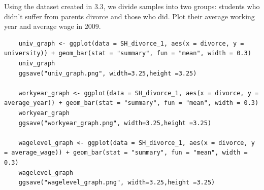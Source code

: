 \documentclass[11pt, letterpaper]{article}
\begin{document}
Using the dataset created in 3.3, we divide samples into two groups: students who didn't suffer from parents divorce and those who did.
Plot their average working year and average wage in 2009. 

\begin{lstlisting}
    univ_graph <- ggplot(data = SH_divorce_1, aes(x = divorce, y = university)) + geom_bar(stat = "summary", fun = "mean", width = 0.3)
    univ_graph
    ggsave("univ_graph.png", width=3.25,height =3.25)

    workyear_graph <- ggplot(data = SH_divorce_1, aes(x = divorce, y = average_year)) + geom_bar(stat = "summary", fun = "mean", width = 0.3)
    workyear_graph
    ggsave("workyear_graph.png", width=3.25,height =3.25)

    wagelevel_graph <- ggplot(data = SH_divorce_1, aes(x = divorce, y = average_wage)) + geom_bar(stat = "summary", fun = "mean", width = 0.3)
    wagelevel_graph
    ggsave("wagelevel_graph.png", width=3.25,height =3.25)

\end{lstlisting}
\end{document}
